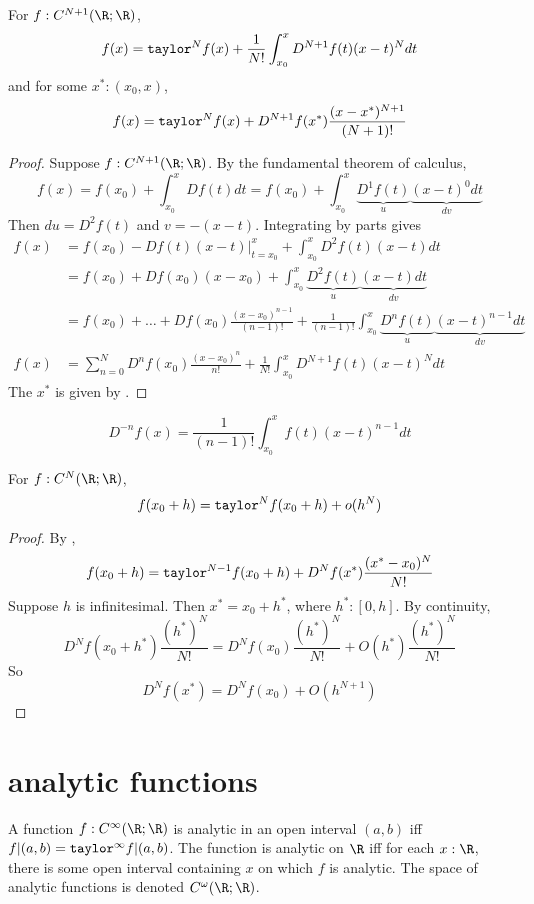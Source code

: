 \documentclass[10pt]{scrartcl}
\begin{document}
\begin{theorem}
  \label{taylor-thm-lagrange}
  For $f:C^{N+1}(\R;\R)$, 
  \[
  f(x)=\mathtt{taylor}^Nf(x)+\frac 1{N!}\int_{x_0}^xD^{N+1}f(t)(x-t)^Ndt
  \]
  and for some $x^*:(x_0,x)$,  
  \[
  f(x)=\mathtt{taylor}^Nf(x)+D^{N+1}f(x^*)\frac{(x-x^*)^{N+1}}{(N+1)!}
  \]
\end{theorem}
\begin{proof}
  Suppose $f:C^{N+1}(\R;\R)$. 
  By the fundamental theorem of calculus,
  \[
  f(x)=f(x_0)+\int_{x_0}^x Df(t)dt=f(x_0)+\int_{x_0}^x\underbrace{D^1f(t)}_{u}\underbrace{(x-t)^0dt}_{dv}
  \]
  Then $du=D^2f(t)$ and $v=-(x-t)$. 
  Integrating by parts gives
  \begin{align*}
    f(x)&=f(x_0)-Df(t)(x-t)\biggl|_{t=x_0}^x+\int_{x_0}^xD^2f(t)(x-t)dt\\
        &=f(x_0)+Df(x_0)(x-x_0)+\int_{x_0}^x\underbrace{D^2f(t)}_u\underbrace{(x-t)dt}_{dv}\\
        &=f(x_0)+\dots+Df(x_0)\frac{(x-x_0)^{n-1}}{(n-1)!} + \frac 1 {(n-1)!}\int_{x_0}^x \underbrace{D^nf(t)}_{u}\underbrace{(x-t)^{n-1}dt}_{dv}\\
    f(x)&=\sum_{n=0}^{N}D^nf(x_0)\frac{(x-x_0)^n}{n!}+\frac 1 {N!}\int_{x_0}^xD^{N+1}f(t)(x-t)^{N}dt
  \end{align*}
The $x^*$ is given by .
\end{proof}
\begin{cor}
  \[
  D^{-n}f(x)=\frac 1 {(n-1)!}\int_{x_0}^xf(t)(x-t)^{n-1}dt
  \]
  \cite{wiki:cauchy-rep-int}
\end{cor}

\begin{cor}
  For $f:C^N(\R;\R)$, 
  \[
  f(x_0+h)= \mathtt{taylor}^Nf(x_0+h)+o(h^N)
  \]
\end{cor}
\begin{proof}
  By , 
  \[
  f(x_0+h)=\mathtt{taylor}^{N-1}f(x_0+h)+D^Nf(x^*)\frac{(x^*-x_0)^N}{N!}
  \]
  Suppose $h$ is infinitesimal. Then $x^*=x_0+h^*$, where $h^*:[0,h]$. By continuity,
  \[
  D^Nf(x_0+h^*)\frac{(h^*)^N}{N!}= D^Nf(x_0)\frac{(h^*)^N}{N!}+O(h^*)\frac{(h^*)^N}{N!}
  \]
  So
  \[
  D^Nf(x^*)= D^Nf(x_0)+O(h^{N+1})
  \]
\end{proof}

\section{analytic functions}
\begin{defn}
  A function $f:C^\infty(\R;\R)$ is analytic in an open interval $(a,b)$ iff $f|(a,b)=\mathtt{taylor}^\infty f|(a,b)$. The function is analytic on $\R$ iff for each $x:\R$, there is some open interval containing $x$ on which $f$ is analytic. The space of analytic functions is denoted $C^\omega(\R;\R)$. 
\end{defn}
\end{document}
